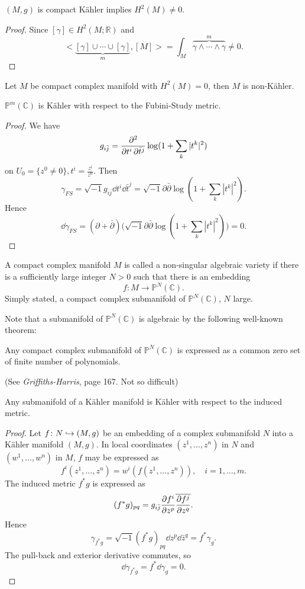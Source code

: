 \documentclass[12pt]{article}
\begin{document}
\begin{lemma}
  \((M,g)\) is compact K\"ahler implies \(H^2(M)\neq 0\).
\end{lemma}
\begin{proof}
  Since \([\gamma]\in H^2(M;\mathbb{R})\) and \[
    \Big<\underbrace{[\gamma]\cup\cdots \cup [\gamma]}_{m},[M]\Big> 
    =\int_{M}\overbrace{\gamma\wedge\cdots \wedge \gamma}^m\neq 0
  .\] 
\end{proof}

\begin{corollary}
  Let \(M\) be compact complex manifold with \(H^2(M)=0\), then \(M\) is
  non-K\"ahler.
\end{corollary}

\begin{example}
  \(\mathbb{P}^m(\mathbb{C})\) is K\"ahler with respect to the Fubini-Study metric.
\end{example}
\begin{proof}
  We have \[
    g_{i\bar{j}}=\pdv{}{t^i,\bar{t}^j}\log(1+\sum_k |t^k|^2)
  \] on \(U_0=\{z^0\neq 0\},t^i=\frac{z^i}{z^0}\). Then \[
    \gamma_{FS}=\sqrt{-1} g_{i\bar{j}}\dd{t^i}\dd{\bar{t}^j}
    =\sqrt{-1}\partial\bar{\partial}\log(1+\sum_k |t^k|^2)
  .\] Hence \[
    \dd{\gamma_{FS}}=(\partial +\bar{\partial})\Big(\sqrt{-1}\partial\bar{\partial}
    \log(1+\sum_k|t^k|^2)\Big)=0
  .\] 
\end{proof}

\begin{definition}
  A compact complex manifold \(M\) is called a non-singular algebraic variety if there
  is a sufficiently large integer \(N>0\) such that there is an embedding \[
    f\colon M\longrightarrow \mathbb{P}^N(\mathbb{C})
  .\] Simply stated, a compact complex submanifold of \(\mathbb{P}^N(\mathbb{C})\),
  \(N\) large.
\end{definition}
Note that a submanifold of \(\mathbb{P}^N(\mathbb{C})\) is algebraic
by the following well-known theorem:
\begin{theorem}[Chow]
  Any compact complex submanifold of \(\mathbb{P}^N(\mathbb{C})\) is expressed as a
  common zero set of finite number of polynomials.
\end{theorem}
(See \emph{Griffiths-Harris}, page 167. Not so difficult)

\begin{prop}
  Any submanifold of a K\"ahler manifold is K\"ahler with respect to the induced
  metric.
\end{prop}
\begin{proof}
  Let \(f\colon N\hookrightarrow(M,g)\) be an embedding of a complex submanifold \(N\) into
  a K\"ahler manifold \((M,g)\). In local coordinates \((z^1,\ldots,z^n)\) in \(N\)
  and \((w^1,\ldots,w^n)\) in \(M\), \(f\) may be expressed as \[
    f^i(z^1,\ldots,z^n)=w^i(f(z^1,\ldots,z^n)),\quad i=1,\ldots,m
  .\] The induced metric \(f^*g\) is expressed as \[
  (f^*g)_{pq}=g_{i\bar{j}}\pdv{f^i}{z^p}\overline{\pdv{f^j}{z^q}}
  .\] Hence \[
    \gamma_{f^*g}=\sqrt{-1}(f^*g)_{pq}\dd{z^p}\dd{\bar{z}^q}=f^*\gamma_g
  .\] The pull-back and exterior derivative commutes, so \[
    \dd{\gamma_{f^*g}}=f^* \dd{\gamma_g}=0
  .\] 
\end{proof}
\end{document}
